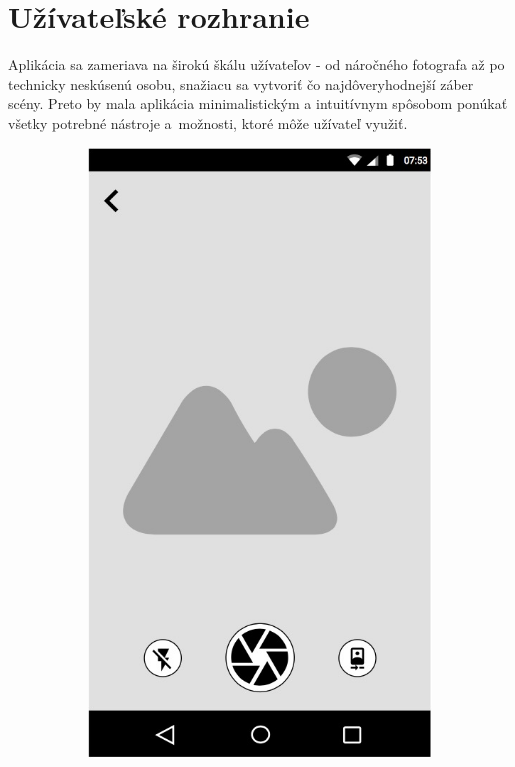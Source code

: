\section{Užívateľské rozhranie}
\label{sec:Practice-UI}

Aplikácia sa zameriava na širokú škálu užívateľov - od náročného fotografa až po technicky neskúsenú
osobu, snažiacu sa vytvoriť čo najdôveryhodnejší záber scény. Preto by mala aplikácia minimalistickým 
a intuitívnym spôsobom ponúkať všetky potrebné nástroje a~možnosti, ktoré môže užívateľ využiť.

\begin{figure}[h!]
  \centering
  \begin{subfigure}{0.3\textwidth}
      \includegraphics[width=\textwidth]{figures/ui/sketches/sketch-capture}

\end{subfigure}
\end{figure}
